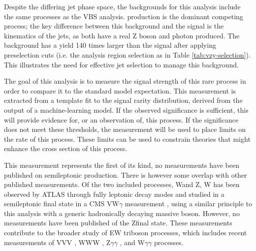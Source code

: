 Despite the differing jet phase space, the backgrounds for this analysis include
the same processes as the \ac{VBS} \Zy analysis. \QCDZy production is the dominant
competing process; the key difference between this background and the signal
is the kinematics of the jets, as both have a real Z boson and photon produced.
%
The \QCDZy background has a yield 140 times larger than the signal after
applying preselection cuts (i.e. the analysis region selection as in Table
\ref{tab:vzy-selection}).  This illustrates the need for effective jet selection
to manage this background.

The goal of this analysis is to measure the signal strength of this rare
process in order to compare it to the standard model expectation.  This
measurement is extracted from a template fit to the signal rarity
distribution, derived from the output of a machine-learning model. If the
observed significance is sufficient, this will provide evidence for, or an
observation of, this process. If the significance does not meet these
thresholds, the measurement will be used to place limits on the rate of this
process. These limits can be used to constrain theories that might enhance the
cross section of this process.

This measurement represents the first of its kind, no measurements have been
published on semileptonic \VZy production. There is however some overlap with
other published measurements. Of the two included processes, W\Zy and Z\Zy, W\Zy
has been observed by \ac{ATLAS} through fully leptonic decay modes
\cite{ATLASwzy2023} and studied in a semileptonic final state in a \ac{CMS}
VW$\gamma$ measurement \cite{CMSvwy2014}, using a similar principle to this
analysis with a generic hadronically decaying massive boson. However, no
measurements have been published of the Z\Zy final state. These measurements
contribute to the broader study of \ac{EW} triboson processes, which includes
recent measurements of
VVV \cite{CMSvvv2020}, 
WWW \cite{ATLASwww2022},
Z$\gamma\gamma$ \cite{ATLASzyy2023,CMSwyyzyy2021},
and W$\gamma\gamma$ \cite{ATLASwyy2023,CMSwyyzyy2021}
processes.

%   

